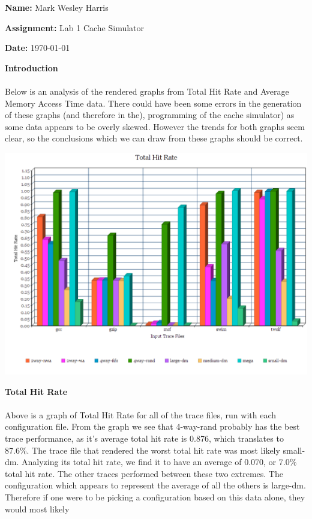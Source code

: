 \documentclass[12pt]{article}
\begin{document}
{\bf Name:} Mark Wesley Harris
\par
{\bf Assignment:} Lab 1 Cache Simulator
\par
{\bf Date:}
\today

\par
\bigskip
{\bf Introduction}\\\\
Below is an analysis of the rendered graphs from Total Hit Rate
and Average Memory Access Time data. There could have been some
errors in the generation of these graphs (and therefore in the),
programming of the cache simulator) as some data appears
to be overly skewed. However the trends for both graphs seem clear,
so the conclusions which we can draw from these graphs should be
correct.\\
\begin{center}
\includegraphics[scale=0.5]{hitrate}
\end{center}
\bigskip
{\bf Total Hit Rate}\\\\
Above is a graph of Total Hit Rate for all of the trace files,
run with each configuration file.
From the graph we see that 4-way-rand probably has the best trace
performance, as it's average total hit rate is 0.876,
which translates to 87.6\%. The trace file that rendered the worst
total hit rate was most likely small-dm. Analyzing its total
hit rate, we find it to have an average of 0.070, or 7.0\% total
hit rate. The other traces performed between these two extremes.
The configuration which appears to represent the average of all the
others is large-dm. Therefore if one were to be picking a
configuration based on this data alone, they would most likely
\end{document}
